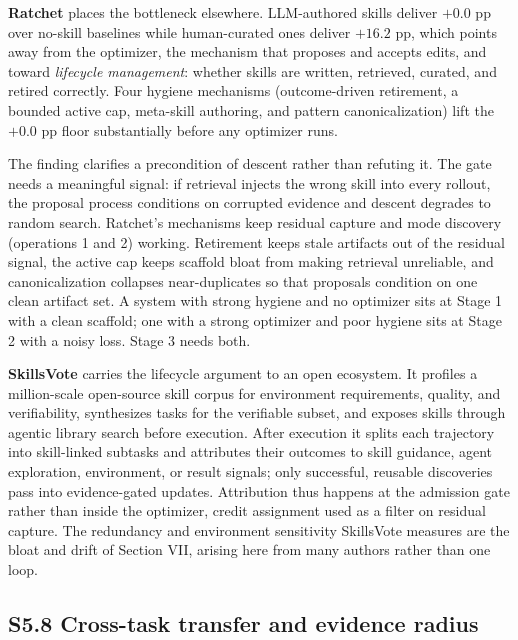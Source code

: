 \documentclass[
]{article}
\begin{document}
\textbf{Ratchet} \cite{zhang2026ratchet} places the bottleneck
elsewhere. LLM-authored skills deliver \(+0.0\) pp over no-skill
baselines while human-curated ones deliver \(+16.2\) pp, which points
away from the optimizer, the mechanism that proposes and accepts edits,
and toward \emph{lifecycle management}: whether skills are written,
retrieved, curated, and retired correctly. Four hygiene mechanisms
(outcome-driven retirement, a bounded active cap, meta-skill authoring,
and pattern canonicalization) lift the \(+0.0\) pp floor substantially
before any optimizer runs.

The finding clarifies a precondition of descent rather than refuting it.
The gate needs a meaningful signal: if retrieval injects the wrong skill
into every rollout, the proposal process conditions on corrupted
evidence and descent degrades to random search. Ratchet's mechanisms
keep residual capture and mode discovery (operations 1 and 2) working.
Retirement keeps stale artifacts out of the residual signal, the active
cap keeps scaffold bloat from making retrieval unreliable, and
canonicalization collapses near-duplicates so that proposals condition
on one clean artifact set. A system with strong hygiene and no optimizer
sits at Stage 1 with a clean scaffold; one with a strong optimizer and
poor hygiene sits at Stage 2 with a noisy loss. Stage 3 needs both.

\textbf{SkillsVote} \cite{liu2026skillsvote} carries the lifecycle
argument to an open ecosystem. It profiles a million-scale open-source
skill corpus for environment requirements, quality, and verifiability,
synthesizes tasks for the verifiable subset, and exposes skills through
agentic library search before execution. After execution it splits each
trajectory into skill-linked subtasks and attributes their outcomes to
skill guidance, agent exploration, environment, or result signals; only
successful, reusable discoveries pass into evidence-gated updates.
Attribution thus happens at the admission gate rather than inside the
optimizer, credit assignment used as a filter on residual capture. The
redundancy and environment sensitivity SkillsVote measures are the bloat
and drift of Section VII, arising here from many authors rather than one
loop.

\subsection{S5.8 Cross-task transfer and evidence
radius}\label{s5.8-cross-task-transfer-and-evidence-radius}
\end{document}
